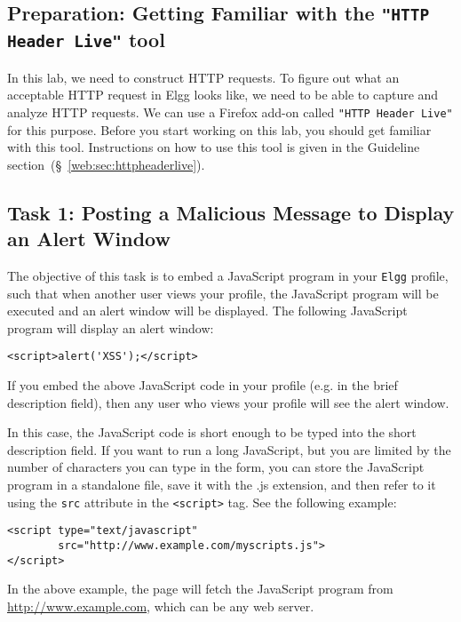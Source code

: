 \subsection{Preparation: Getting Familiar with the \texttt{"HTTP Header Live"} tool}

In this lab, we need to construct HTTP requests. To figure out 
what an acceptable HTTP request in Elgg looks like, we need to 
be able to capture and analyze HTTP requests. 
We can use a Firefox add-on called \texttt{"HTTP Header Live"} for this
purpose. Before you start working on this lab, you should 
get familiar with this tool.
Instructions on how to use this tool is given in the Guideline
section~(\S~\ref{web:sec:httpheaderlive}).



\subsection{Task 1: Posting a Malicious Message to Display an Alert Window}

The objective of this task is to embed a JavaScript program in your 
{\tt Elgg} profile, such that when another user views your profile, 
the JavaScript program will be executed and an alert window
will be displayed. The following JavaScript program will display an alert window: 
\begin{lstlisting}
<script>alert('XSS');</script> 
\end{lstlisting}
If you embed the above JavaScript code in your profile (e.g. in the brief
description field), then any user who views your profile will see the alert window. 

In this case, the JavaScript code is short enough to be typed into the 
short description field. If you want to run a long JavaScript, but you are limited
by the number of characters you can type in the form, you can store the 
JavaScript program in a standalone file, save it with the .js extension, and 
then refer to it using the {\tt src} attribute in the {\tt <script>} tag. 
See the following example:
\begin{lstlisting}
<script type="text/javascript" 
        src="http://www.example.com/myscripts.js">
</script>
\end{lstlisting}
In the above example, the page will fetch the JavaScript program from
\url{http://www.example.com}, which can be any web server.



